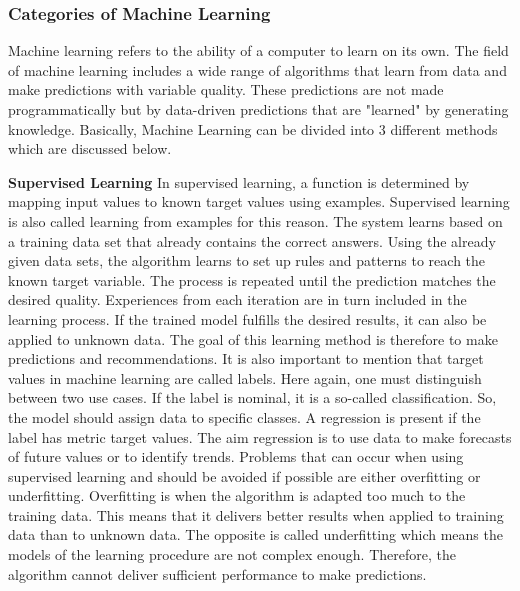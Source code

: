\subsubsection{Categories of Machine Learning}

Machine learning refers to the ability of a computer to learn on its own.
The field of machine learning includes a wide range of algorithms that learn
from data and make predictions with variable quality.
These predictions are not made programmatically but by data-driven predictions
that are "learned" by generating knowledge. Basically,
Machine Learning can be divided into 3 different methods which are discussed below.\cite[4]{2018VDMAQuick}

\textbf{Supervised Learning}
In supervised learning, a function is determined by mapping input values to known target
values using examples. Supervised learning is also called learning from examples for this reason.\cite[96]{schacht2019blockchain}
The system learns based on a training data set that already contains the correct answers.
Using the already given data sets, the algorithm learns to set up rules and patterns to
reach the known target variable. The process is repeated until the prediction matches the desired quality.
Experiences from each iteration are in turn included in the learning process.
If the trained model fulfills the desired results, it can also be applied to unknown data.
The goal of this learning method is therefore to make predictions and recommendations.\cite[96]{schacht2019blockchain}
It is also important to mention that target values in machine learning are called labels.
Here again, one must distinguish between two use cases. If the label is nominal, it is a so-called
classification. So, the model should assign data to specific classes.
A regression is present if the label has metric target values.\cite[46]{Paass2020}
The aim regression is to use data to make forecasts of future values or to identify trends.
Problems that can occur when using supervised learning and should be avoided if possible
are either overfitting or underfitting.  Overfitting is when the algorithm is adapted too much
to the training data.
This means that it delivers better results when applied to training data than to unknown data.
The opposite is called underfitting which means the models of the learning procedure are not complex
enough.
Therefore, the algorithm cannot deliver sufficient performance to make predictions.\cite{buxmann2018künstliche}


